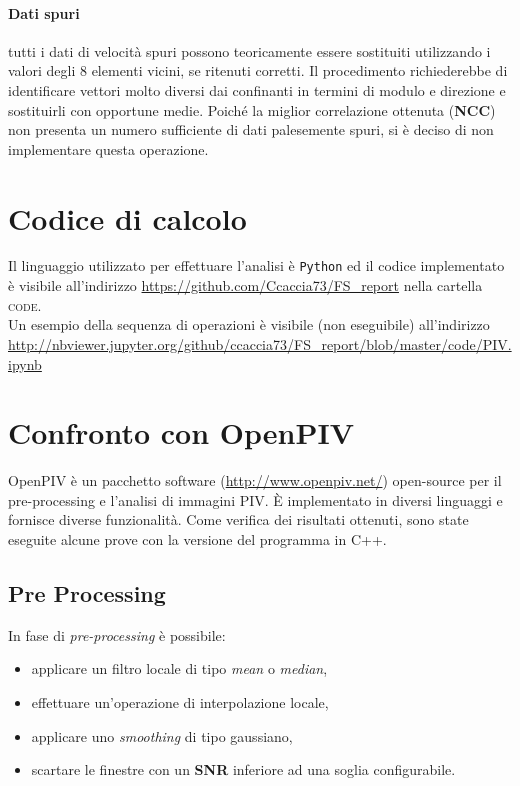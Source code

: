 \documentclass[a4paper]{article}
\begin{document}
\paragraph{Dati spuri} tutti i dati di velocità spuri possono teoricamente essere sostituiti utilizzando i valori degli 8 elementi vicini, se ritenuti corretti. Il procedimento richiederebbe di identificare vettori molto diversi dai confinanti in termini di modulo e direzione e sostituirli con opportune medie. Poiché la miglior correlazione ottenuta (\textbf{NCC}) non presenta un numero sufficiente di dati palesemente spuri, si è deciso di non implementare questa operazione.

\section{Codice di calcolo}

Il linguaggio utilizzato per effettuare l'analisi è \texttt{Python} ed il codice implementato è visibile all'indirizzo \url{https://github.com/Ccaccia73/FS_report} nella cartella \textsc{code}.\\
Un esempio della sequenza di operazioni è visibile (non eseguibile) all'indirizzo \url{http://nbviewer.jupyter.org/github/ccaccia73/FS_report/blob/master/code/PIV.ipynb}


\clearpage

\section{Confronto con OpenPIV}

OpenPIV è un pacchetto software (\url{http://www.openpiv.net/}) open-source per il pre-processing e l'analisi di immagini PIV. \`{E} implementato in diversi linguaggi e fornisce diverse funzionalità. Come verifica dei risultati ottenuti, sono state eseguite alcune prove con la versione del programma in \textsc{C++}.  

\subsection{Pre Processing}

In fase di \textit{pre-processing} è possibile:

\begin{itemize}
	\item applicare un filtro locale di tipo \textit{mean} o \textit{median},
	\item effettuare un'operazione di interpolazione locale,
	\item applicare uno \textit{smoothing} di tipo gaussiano,
	\item scartare le finestre con un \textbf{SNR} inferiore ad una soglia configurabile.
\end{itemize}
\end{document}
